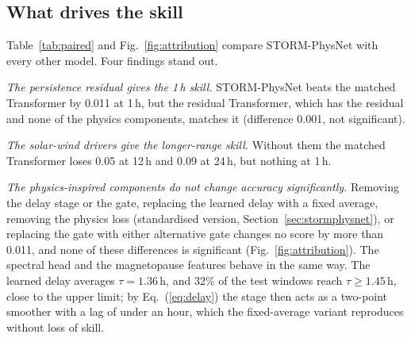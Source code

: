 \documentclass[a4paper,fleqn]{cas-dc}
\begin{document}


\subsection{What drives the skill}
\label{sec:attribution}
Table~\ref{tab:paired} and Fig.~\ref{fig:attribution} compare STORM-PhysNet with every other model. Four
findings stand out.

\emph{The persistence residual gives the 1\,h skill.} STORM-PhysNet beats the matched Transformer by 0.011 at
1\,h, but the residual Transformer, which has the residual and none of the physics components, matches it
(difference 0.001, not significant).

\emph{The solar-wind drivers give the longer-range skill.} Without them the matched Transformer loses 0.05 at
12\,h and 0.09 at 24\,h, but nothing at 1\,h.

\emph{The physics-inspired components do not change accuracy significantly.} Removing the delay stage or the
gate, replacing the learned delay with a fixed average, removing the physics loss (standardised
version, Section~\ref{sec:stormphysnet}), or replacing the gate with
either alternative gate changes no score by more than 0.011, and none of these differences is significant
(Fig.~\ref{fig:attribution}). The spectral head and the magnetopause features behave in the same way. The
learned delay averages \(\tau=1.36\)\,h, and 32\% of the test windows reach \(\tau\ge1.45\)\,h, close to the upper
limit; by Eq.~(\ref{eq:delay}) the stage then acts as a two-point smoother with a lag of under an hour, which the
fixed-average variant reproduces without loss of skill.
\end{document}

